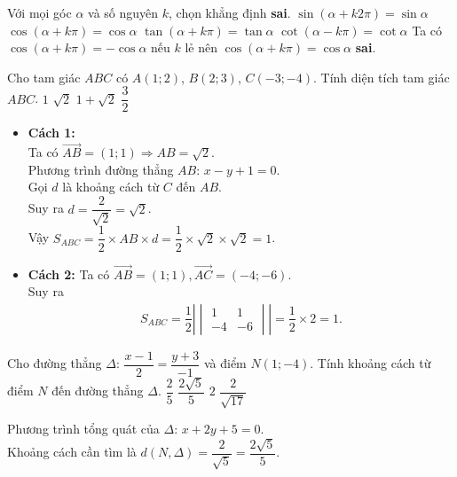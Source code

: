 \begin{ex}%
Với mọi góc $ \alpha $	và số nguyên $ k $, chọn khẳng định \textbf{sai}.
	\choice
	{$ \sin \left(\alpha + k2 \pi \right) = \sin \alpha $}
	{\True $ \cos \left(\alpha + k \pi \right) = \cos \alpha $}	
	{$ \tan \left(\alpha + k \pi \right) = \tan \alpha $}
	{$ \cot \left(\alpha - k \pi \right) = \cot \alpha $}
	\loigiai
	{Ta có $ \cos \left(\alpha + k \pi \right) = -\cos \alpha $ nếu $ k $ lẻ nên $ \cos \left(\alpha + k \pi \right) = \cos \alpha $ \textbf{sai}.
}
\end{ex}
\begin{ex}%
Cho tam giác $ ABC $	 có $ A(1;2) $, $ B(2;3) $, $ C(-3;-4) $. Tính diện tích tam giác $ ABC $.
	\choice
	{\True $ 1 $}
	{$ \sqrt{2} $}
	{$ 1 +  \sqrt{2}$}
	{$ \dfrac{3}{2} $}
	\loigiai
	{\begin{itemize}
			\item \textbf{Cách 1:} \\
			Ta có $ \vec{AB} = (1;1) \Rightarrow AB = \sqrt{2}$.\\
			Phương trình đường thẳng $ AB $: $ x - y + 1 =0 . $\\
			Gọi $ d $ là khoảng cách từ $ C $ đến $ AB $.\\ Suy ra $ d = \dfrac{2}{\sqrt{2}} = \sqrt{2}$.\\
			Vậy $ S_{ABC} = \dfrac{1}{2} \times AB \times d = \dfrac{1}{2} \times \sqrt{2} \times \sqrt{2} =1 $.
			
			\item \textbf{Cách 2:} 
			Ta có $ \vec{AB} = (1;1), \vec{AC} = (-4;-6) $. \\
			Suy ra  \begin{align*}
			S_{ABC} = \dfrac{1}{2}\left| \begin{vmatrix}
			1 & 1 \\
			-4 & -6
			\end{vmatrix} \right| = \dfrac{1}{2} \times 2 = 1.
			\end{align*}
		\end{itemize}
		
	}
\end{ex}
\begin{ex}%
Cho đường thẳng $ \Delta $: $ \dfrac{x-1}{2} = \dfrac{y + 3}{-1} $ và điểm $ N(1;-4) $. Tính khoảng cách từ điểm $ N $ đến đường thẳng $ \Delta $.
	\choice
	{$ \dfrac{2}{5} $}
	{\True $ \dfrac{2\sqrt{5}}{5} $}
	{$ 2 $}
	{$ \dfrac{2}{\sqrt{17}} $}
	\loigiai
	{Phương trình tổng quát của $ \Delta $: $ x + 2y + 5 = 0 $.\\
		Khoảng cách cần tìm là $ d\left(N,\Delta\right) = \dfrac{2}{\sqrt{5}} = \dfrac{2 \sqrt{5}}{5} .$
		
	}
\end{ex}
